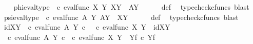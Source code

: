 \begin{isabellebody}
\ \ \isamarkupfalse%
\ phi{\isacharunderscore}{\kern0pt}eval{\isacharunderscore}{\kern0pt}type{\isacharcolon}{\kern0pt}\ {\isachardoublequoteopen}{\isacharparenleft}{\kern0pt}{\isasymphi}\ {\isasymcirc}\isactrlsub c\ eval{\isacharunderscore}{\kern0pt}func\ X\ Y{\isacharparenright}{\kern0pt}\isactrlsup {\isasymsharp}{\isacharcolon}{\kern0pt}\ X\isactrlbsup Y\isactrlesup \ {\isasymrightarrow}\ A\isactrlbsup Y\isactrlesup {\isachardoublequoteclose}\isanewline
\ \ \ \ \isamarkupfalse%
\ {\isasymphi}{\isacharunderscore}{\kern0pt}def\ \isamarkupfalse%
\ {\isacharparenleft}{\kern0pt}typecheck{\isacharunderscore}{\kern0pt}cfuncs{\isacharcomma}{\kern0pt}\ blast{\isacharparenright}{\kern0pt}\isanewline
\ \ \isamarkupfalse%
\ psi{\isacharunderscore}{\kern0pt}eval{\isacharunderscore}{\kern0pt}type{\isacharcolon}{\kern0pt}\ {\isachardoublequoteopen}{\isacharparenleft}{\kern0pt}{\isasympsi}\ {\isasymcirc}\isactrlsub c\ eval{\isacharunderscore}{\kern0pt}func\ A\ Y{\isacharparenright}{\kern0pt}\isactrlsup {\isasymsharp}{\isacharcolon}{\kern0pt}\ A\isactrlbsup Y\isactrlesup \ {\isasymrightarrow}\ X\isactrlbsup Y\isactrlesup {\isachardoublequoteclose}\isanewline
\ \ \ \ \isamarkupfalse%
\ {\isasympsi}{\isacharunderscore}{\kern0pt}def\ \isamarkupfalse%
\ {\isacharparenleft}{\kern0pt}typecheck{\isacharunderscore}{\kern0pt}cfuncs{\isacharcomma}{\kern0pt}\ blast{\isacharparenright}{\kern0pt}\isanewline
\isanewline
\ \ \isamarkupfalse%
\ idXY{\isacharcolon}{\kern0pt}\ {\isachardoublequoteopen}{\isacharparenleft}{\kern0pt}{\isasympsi}\ {\isasymcirc}\isactrlsub c\ eval{\isacharunderscore}{\kern0pt}func\ A\ Y{\isacharparenright}{\kern0pt}\isactrlsup {\isasymsharp}\ {\isasymcirc}\isactrlsub c\ \ {\isacharparenleft}{\kern0pt}{\isasymphi}\ {\isasymcirc}\isactrlsub c\ eval{\isacharunderscore}{\kern0pt}func\ X\ Y{\isacharparenright}{\kern0pt}\isactrlsup {\isasymsharp}\ {\isacharequal}{\kern0pt}\ id{\isacharparenleft}{\kern0pt}X\isactrlbsup Y\isactrlesup {\isacharparenright}{\kern0pt}{\isachardoublequoteclose}\isanewline
\ \ \isamarkupfalse%
\ {\isacharminus}{\kern0pt}\ \isanewline
\ \ \ \ \isamarkupfalse%
\ {\isachardoublequoteopen}{\isacharparenleft}{\kern0pt}{\isasympsi}\ {\isasymcirc}\isactrlsub c\ eval{\isacharunderscore}{\kern0pt}func\ A\ Y{\isacharparenright}{\kern0pt}\isactrlsup {\isasymsharp}\ {\isasymcirc}\isactrlsub c\ {\isacharparenleft}{\kern0pt}{\isasymphi}\ {\isasymcirc}\isactrlsub c\ eval{\isacharunderscore}{\kern0pt}func\ X\ Y{\isacharparenright}{\kern0pt}\isactrlsup {\isasymsharp}\ {\isacharequal}{\kern0pt}\ {\isasympsi}\isactrlbsup Y\isactrlesup \isactrlsub f\ {\isasymcirc}\isactrlsub c\ {\isasymphi}\isactrlbsup Y\isactrlesup \isactrlsub f{\isachardoublequoteclose}\isanewline

\end{isabellebody}

